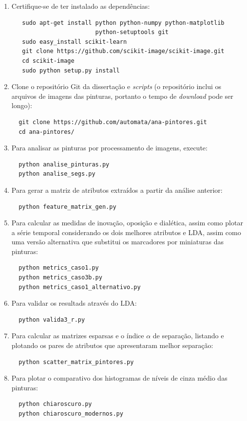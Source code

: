 \begin{enumerate}
  \item Certifique-se de ter instalado as dependências:
\begin{verbatim}
   sudo apt-get install python python-numpy python-matplotlib
                        python-setuptools git
   sudo easy_install scikit-learn
   git clone https://github.com/scikit-image/scikit-image.git
   cd scikit-image
   sudo python setup.py install
\end{verbatim}
  \item Clone o repositório Git da dissertação e \textit{scripts} (o repositório
    inclui os arquivos de imagens das pinturas, portanto o tempo de
    \textit{download} pode ser longo):
\begin{verbatim}
  git clone https://github.com/automata/ana-pintores.git
  cd ana-pintores/
\end{verbatim}
  \item Para analisar as pinturas por processamento de imagens, execute:
\begin{verbatim}
  python analise_pinturas.py
  python analise_segs.py
\end{verbatim}
  \item Para gerar a matriz de atributos extraídos a partir da análise anterior:
\begin{verbatim}
  python feature_matrix_gen.py
\end{verbatim}
  \item Para calcular as medidas de inovação, oposição e dialética, assim como
    plotar a série temporal considerando os dois melhores atributos e LDA, assim
    como uma versão alternativa que substitui os marcadores por miniaturas das
    pinturas:
\begin{verbatim}
  python metrics_caso1.py
  python metrics_caso3b.py
  python metrics_caso1_alternativo.py
\end{verbatim}
  \item Para validar os resultads através do LDA:
\begin{verbatim}
  python valida3_r.py
\end{verbatim}
  \item Para calcular as matrizes esparsas e o índice $\alpha$ de separação,
    listando e plotando os pares de atributos que apresentaram melhor separação: 
\begin{verbatim}
  python scatter_matrix_pintores.py
\end{verbatim}
  \item Para plotar o comparativo dos histogramas de níveis de cinza médio das pinturas:
\begin{verbatim}
  python chiaroscuro.py
  python chiaroscuro_modernos.py
\end{verbatim}
\end{enumerate}

